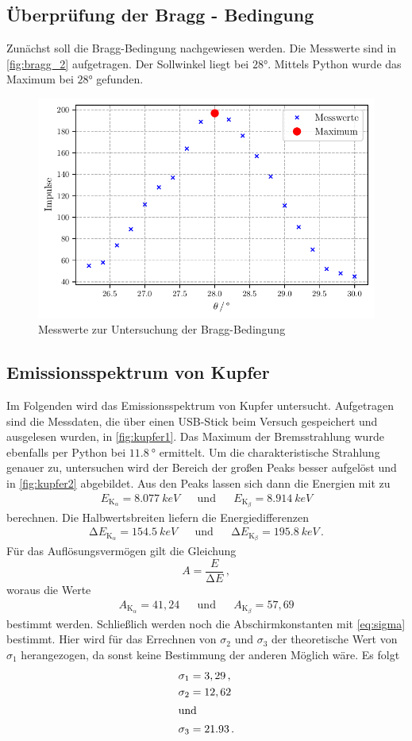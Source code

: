 \subsection{Überprüfung der Bragg - Bedingung}
Zunächst soll die Bragg-Bedingung nachgewiesen werden.
Die Messwerte sind in \autoref{fig:bragg_2} aufgetragen.
Der Sollwinkel liegt bei $28°$.
Mittels Python wurde das Maximum bei $28°$ gefunden.

\begin{figure}
  \centering
  \includegraphics[width=0.5 \linewidth]{build/bragg.pdf}
  \caption{Messwerte zur Untersuchung der Bragg-Bedingung}
  \label{fig:bragg_2}
\end{figure}

\subsection{Emissionsspektrum von Kupfer}
Im Folgenden wird das Emissionsspektrum von Kupfer untersucht.
Aufgetragen sind die Messdaten, die über einen USB-Stick beim Versuch gespeichert und ausgelesen wurden, in \autoref{fig:kupfer1}.
Das Maximum der Bremsstrahlung wurde ebenfalls per Python bei $\qty{11.8}{°}$ ermittelt.  
Um die charakteristische Strahlung genauer zu, untersuchen wird der Bereich der großen Peaks besser aufgelöst und in \autoref{fig:kupfer2} abgebildet.
Aus den Peaks lassen sich dann die Energien mit zu
\begin{align*}
  E_{\text{K}_\alpha} = \qty{8.077}{keV} &&\text{und}&& E_{\text{K}_\beta} = \qty{8.914}{keV}
\end{align*}
berechnen.
Die Halbwertsbreiten liefern die Energiedifferenzen
\begin{align*}
  \increment E_{\text{K}_\alpha} = \qty{154.5}{keV} &&\text{und}&& \increment E_{\text{K}_\beta} = \qty{195.8}{keV} \, .
\end{align*}
Für das Auflösungsvermögen gilt die Gleichung
\begin{equation*}
  A = \frac{E}{\increment E} \, ,
\end{equation*}
woraus die Werte
\begin{align*}
  A_{\text{K}_\alpha} = 41,24 && \text{und} && A_{\text{K}_\beta} = 57,69
\end{align*}
bestimmt werden.
Schließlich werden noch die Abschirmkonstanten mit \autoref{eq:sigma} bestimmt.
Hier wird für das Errechnen von $\sigma_2$ und $\sigma_3$ der theoretische Wert von $\sigma_1$ herangezogen, da sonst keine Bestimmung der anderen Möglich wäre. 
Es folgt
\begin{align*}
  \sigma_{1} &= 3,29 \, ,\\
  \sigma_{2} &= 12,62 \\ 
  \intertext{und}
  \sigma_{3} &= 21.93 \, .
\end{align*}

